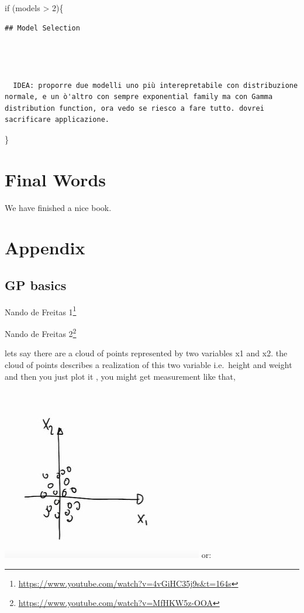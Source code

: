 \documentclass[
  12pt,
  a4paper,
  oneside]{book}
\DeclareRobustCommand{\href}[2]{#2\footnote{\url{#1}}}
\theoremstyle{definition}
\theoremstyle{definition}
\theoremstyle{definition}
\theoremstyle{remark}
\begin{document}
if (models \textgreater{} 2)\{

\begin{verbatim}
## Model Selection




  IDEA: proporre due modelli uno più interepretabile con distribuzione normale, e un ò'altro con sempre exponential family ma con Gamma distribution function, ora vedo se riesco a fare tutto. dovrei sacrificare applicazione.
\end{verbatim}

\}

\hypertarget{final-words}{%
\chapter{Final Words}\label{final-words}}

We have finished a nice book.

\hypertarget{appendix}{%
\chapter*{Appendix}\label{appendix}}

\hypertarget{gp-basics}{%
\section{GP basics}\label{gp-basics}}

\href{https://www.youtube.com/watch?v=4vGiHC35j9s\&t=164s}{Nando de Freitas 1}

\href{https://www.youtube.com/watch?v=MfHKW5z-OOA}{Nando de Freitas 2}

lets say there are a cloud of points represented by two variables x1 and x2. the cloud of points describes a realization of this two variable i.e.~height and weight and then you just plot it , you might get measurement like that,

\includegraphics{appendix_images/gp_base_1.jpg}
or:
\end{document}
